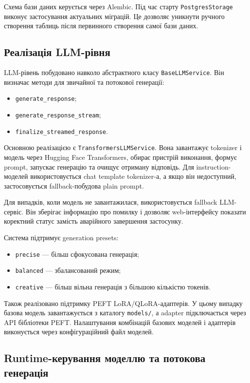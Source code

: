 Схема бази даних керується через Alembic. Під час старту \texttt{PostgresStorage} виконує застосування актуальних міграцій. Це дозволяє уникнути ручного створення таблиць після первинного створення самої бази даних.

\subsection{Реалізація LLM-рівня}

LLM-рівень побудовано навколо абстрактного класу \texttt{BaseLLMService}. Він визначає методи для звичайної та потокової генерації:
\begin{itemize}
  \item \texttt{generate\_response};
  \item \texttt{generate\_response\_stream};
  \item \texttt{finalize\_streamed\_response}.
\end{itemize}

Основною реалізацією є \texttt{TransformersLLMService}. Вона завантажує tokenizer і модель через Hugging Face Transformers, обирає пристрій виконання, формує prompt, запускає генерацію та очищує отриману відповідь. Для instruction-моделей використовується chat template tokenizer-а, а якщо він недоступний, застосовується fallback-побудова plain prompt.

Для випадків, коли модель не завантажилася, використовується fallback LLM-сервіс. Він зберігає інформацію про помилку і дозволяє web-інтерфейсу показати коректний статус замість аварійного завершення застосунку.

Система підтримує generation presets:
\begin{itemize}
  \item \texttt{precise} --- більш сфокусована генерація;
  \item \texttt{balanced} --- збалансований режим;
  \item \texttt{creative} --- більш вільна генерація з більшою кількістю токенів.
\end{itemize}

Також реалізовано підтримку PEFT LoRA/QLoRA-адаптерів. У цьому випадку базова модель завантажується з каталогу \texttt{models/}, а adapter підключається через API бібліотеки PEFT. Налаштування комбінацій базових моделей і адаптерів виконується через конфігураційний файл моделей.

\subsection{Runtime-керування моделлю та потокова генерація}

